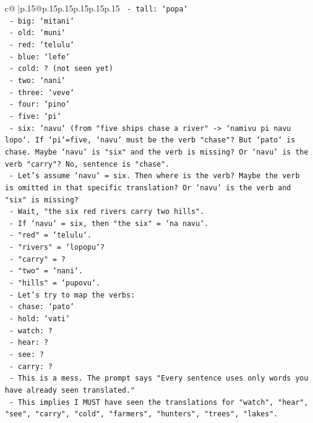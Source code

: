 \documentclass{article}
\begin{document}
{\begin{supertabular}{c@{$\;$}|p{.15\linewidth}@{}p{.15\linewidth}p{.15\linewidth}p{.15\linewidth}p{.15\linewidth}p{.15\linewidth}}
{{{\texttt{    {-} tall: `popa`} \\
\texttt{    {-} big: `mitani`} \\
\texttt{    {-} old: `muni`} \\
\texttt{    {-} red: `telulu`} \\
\texttt{    {-} blue: `lefe`} \\
\texttt{    {-} cold: ? (not seen yet)} \\
\texttt{    {-} two: `nani`} \\
\texttt{    {-} three: `veve`} \\
\texttt{    {-} four: `pino`} \\
\texttt{    {-} five: `pi`} \\
\texttt{    {-} six: `navu` (from "five ships chase a river" {-}> `namivu pi navu lopo`. If `pi`=five, `navu` must be the verb "chase"? But `pato` is chase. Maybe `navu` is "six" and the verb is missing? Or `navu` is the verb "carry"? No, sentence is "chase".} \\
\texttt{    {-} Let's assume `navu` = six. Then where is the verb? Maybe the verb is omitted in that specific translation? Or `navu` is the verb and "six" is missing?} \\
\texttt{    {-} Wait, "the six red rivers carry two hills".} \\
\texttt{    {-} If `navu` = six, then "the six" = `na navu`.} \\
\texttt{    {-} "red" = `telulu`.} \\
\texttt{    {-} "rivers" = `lopopu`?} \\
\texttt{    {-} "carry" = ?} \\
\texttt{    {-} "two" = `nani`.} \\
\texttt{    {-} "hills" = `pupovu`.} \\
\texttt{  {-} Let's try to map the verbs:} \\
\texttt{    {-} chase: `pato`} \\
\texttt{    {-} hold: `vati`} \\
\texttt{    {-} watch: ?} \\
\texttt{    {-} hear: ?} \\
\texttt{    {-} see: ?} \\
\texttt{    {-} carry: ?} \\
\texttt{  {-} This is a mess. The prompt says "Every sentence uses only words you have already seen translated."} \\
\texttt{  {-} This implies I MUST have seen the translations for "watch", "hear", "see", "carry", "cold", "farmers", "hunters", "trees", "lakes".} \\
}}}
\end{supertabular}}
\end{document}

